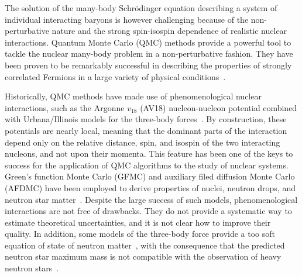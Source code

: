 \documentclass[aps,prc,twocolumn,superscriptaddress,floatfix]{revtex4-1}
\begin{document}
The solution of the many-body Schr\"odinger equation describing a system of individual 
interacting baryons is however challenging because of the non-perturbative 
nature and the strong spin-isospin dependence of realistic nuclear interactions. 
Quantum Monte Carlo (QMC) methods provide a powerful tool to tackle the nuclear 
many-body problem in a non-perturbative fashion. They have been proven to be 
remarkably successful in describing the properties of strongly correlated 
Fermions in a large variety of physical conditions~\cite{Carlson:2015}. 

Historically, QMC methods have made use of phenomenological nuclear interactions, 
such as the Argonne $v_{18}$ (AV18) nucleon-nucleon potential combined
with Urbana/Illinois models for the three-body forces~\cite{Carlson:2015}.
By construction, these potentials are nearly local, meaning that the dominant parts 
of the interaction depend only on the relative distance, spin, and isospin of the
two interacting nucleons, and not upon their momenta.
This feature has been one of the keys to success
for the application of QMC algorithms to the study of nuclear systems. Green's function
Monte Carlo (GFMC) and auxiliary filed diffusion Monte Carlo (AFDMC) have been employed 
to derive properties of nuclei, neutron drops, and neutron star 
matter~\cite{Gandolfi:2011,Gandolfi:2012,Maris:2013,Gandolfi:2014,Gandolfi:2014_epja,Buraczynski:2016,Buraczynski:2017}.
Despite the large success of such models, phenomenological interactions are not free of
drawbacks. They do not provide a systematic way to estimate theoretical uncertainties, 
and it is not clear how to improve their quality. In addition, some models of the 
three-body force provide a too soft equation of state of neutron matter~\cite{Sarsa:2003,Maris:2013},
with the consequence that the predicted neutron star maximum mass is not compatible
with the observation of heavy neutron stars~\cite{Demorest:2010,Antoniadis:2013}.
\end{document}

